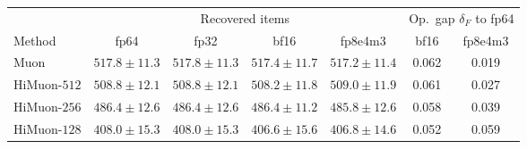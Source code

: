 \begin{tabular}{lcccc cc}
  \toprule
  & \multicolumn{4}{c}{Recovered items} & \multicolumn{2}{c}{Op.\ gap $\delta_F$ to fp64} \\
  \cmidrule(lr){2-5} \cmidrule(lr){6-7}
  Method        & fp64 & fp32 & bf16 & fp8e4m3 & bf16 & fp8e4m3 \\
  \midrule
  Muon          & $517.8\!\pm\!11.3$ & $517.8\!\pm\!11.3$ & $517.4\!\pm\!11.7$ & $517.2\!\pm\!11.4$ & 0.062 & 0.019 \\
  HiMuon-$512$  & $508.8\!\pm\!12.1$ & $508.8\!\pm\!12.1$ & $508.2\!\pm\!11.8$ & $509.0\!\pm\!11.9$ & 0.061 & 0.027 \\
  HiMuon-$256$  & $486.4\!\pm\!12.6$ & $486.4\!\pm\!12.6$ & $486.4\!\pm\!11.2$ & $485.8\!\pm\!12.6$ & 0.058 & 0.039 \\
  HiMuon-$128$  & $408.0\!\pm\!15.3$ & $408.0\!\pm\!15.3$ & $406.6\!\pm\!15.6$ & $406.8\!\pm\!14.6$ & 0.052 & 0.059 \\
  \bottomrule
\end{tabular}
